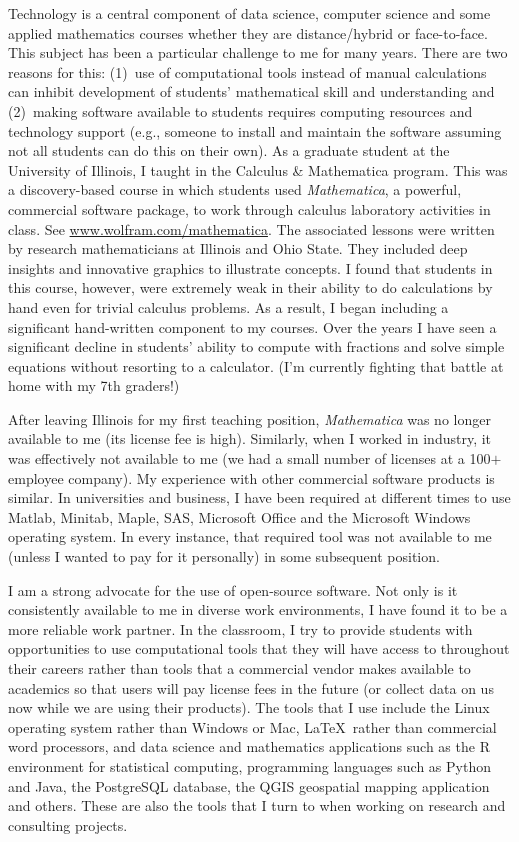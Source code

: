 \documentclass[10pt]{article}
\begin{document}
Technology is a central component of data science, computer science and some applied mathematics 
courses whether they are distance/hybrid or face-to-face.  This subject has been a particular
challenge to me for many years.  There are two reasons for this: (1)~use of computational tools
instead of manual calculations can inhibit development of students' mathematical skill and understanding
and (2)~making software available to students requires computing resources and technology 
support (e.g., someone to install and maintain the software assuming not all students can do this on
their own).  
As a graduate student at the University of Illinois, I taught in 
the Calculus \& Mathematica program.  This was a discovery-based course in which students used
\textit{Mathematica}, a powerful, commercial software package, to work through 
calculus laboratory activities in class.  
See \href{https://www.wolfram.com/mathematica}{www.wolfram.com/mathematica}.
The associated lessons were written by research mathematicians at Illinois and Ohio State.  
They included deep insights and innovative graphics to illustrate concepts.  
I found that students in this course, however, were extremely weak in their ability to 
do calculations by hand even for trivial calculus problems.  As a result, I began including 
a significant hand-written component to my courses.  Over the years I have seen a significant
decline in students' ability to compute with fractions and solve simple equations without
resorting to a calculator. (I'm currently fighting that battle at home with my 7th graders!)

After leaving Illinois for my first teaching position, \textit{Mathematica} was no longer available 
to me  (its license fee is high).  Similarly, when I worked in industry, it was
effectively not available to me (we had a small number of licenses at a 100$+$ employee 
company).  My experience with other commercial software products is similar.
In universities and business, I have been required at different times to use Matlab, Minitab, 
Maple, SAS, Microsoft Office  and the Microsoft Windows operating system.  In every instance, that 
required tool was not available to me (unless I wanted to pay for it personally) in some subsequent
position.  

I am a strong advocate for the use of open-source software.  Not only is it consistently available
to me in diverse work environments, I have found it to be a more reliable work partner.  
In the classroom, I try to provide students with  opportunities to use computational tools
that they will have access to throughout their careers rather than tools that a commercial
vendor makes available to academics so that users will pay license fees in the future
(or collect data on us now while we are using their products).
The tools that I use 
include the Linux operating system rather than Windows or Mac, \LaTeX\ rather than 
commercial word processors, and data science and mathematics applications such as
the R environment for statistical computing, programming languages such as Python and Java,
the PostgreSQL database, the QGIS geospatial mapping application and others.  These
are also the tools that I turn to when working on research and consulting projects.
\end{document}
